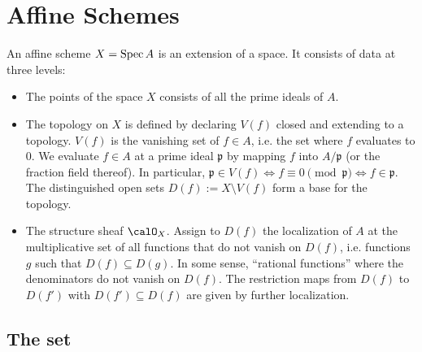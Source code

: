 \documentclass[12pt]{article}
\begin{document}




\section{Affine Schemes}

\begin{definition}
An affine scheme $X = \operatorname{Spec}{A}$ is an extension of a space. It consists of data at three levels: 
\begin{itemize}
    \item The points of the space $X$ consists of all the prime ideals of $A$.
    \item The topology on $X$ is defined by declaring $V(f)$ closed and extending to a topology. $V(f)$ is the vanishing set of $f \in A$, i.e. the set where $f$ evaluates to $0$. We evaluate $f \in A$ at a prime ideal $\mathfrak{p}$ by mapping $f$ into $A/\mathfrak{p}$ (or the fraction field thereof). In particular, $\mathfrak{p} \in V(f) \iff f \equiv 0 \pmod{\mathfrak{p}} \iff f \in \mathfrak{p}$. \\
    The distinguished open sets $D(f) := X\setminus V(f)$ form a base for the topology. 
    \item The structure sheaf $\calO_X$. Assign to $D(f)$ the localization of $A$ at the multiplicative set of all functions that do not vanish on $D(f)$, i.e. functions $g$ such that $D(f) \subseteq D(g)$. In some sense, ``rational functions'' where the denominators do not vanish on $D(f)$. The restriction maps from $D(f)$ to $D(f')$ with $D(f') \subseteq D(f)$ are given by further localization.
\end{itemize}
    
\end{definition}

\subsection{The set}
\end{document}
